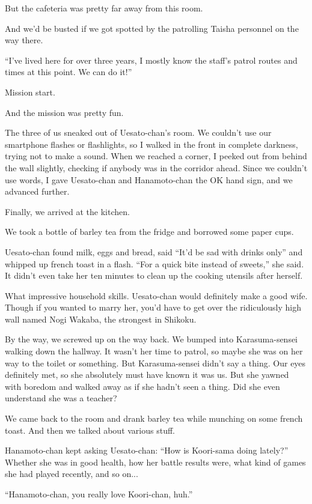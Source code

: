 But the cafeteria was pretty far away from this room.

And we'd be busted if we got spotted by the patrolling Taisha personnel on the way there.

``I've lived here for over three years, I mostly know the staff's patrol routes and times at this point. We can do it!''

Mission start.

And the mission was pretty fun.

The three of us sneaked out of Uesato-chan's room. We couldn't use our smartphone flashes or flashlights, so I walked in the front in complete darkness, trying not to make a sound. When we reached a corner, I peeked out from behind the wall slightly, checking if anybody was in the corridor ahead. Since we couldn't use words, I gave Uesato-chan and Hanamoto-chan the OK hand sign, and we advanced further.

Finally, we arrived at the kitchen.

We took a bottle of barley tea from the fridge and borrowed some paper cups.

Uesato-chan found milk, eggs and bread, said ``It'd be sad with drinks only'' and whipped up french toast in a flash. ``For a quick bite instead of sweets,'' she said. It didn't even take her ten minutes to clean up the cooking utensils after herself.

What impressive household skills. Uesato-chan would definitely make a good wife. Though if you wanted to marry her, you'd have to get over the ridiculously high wall named Nogi Wakaba, the strongest in Shikoku.

By the way, we screwed up on the way back. We bumped into Karasuma-sensei walking down the hallway. It wasn't her time to patrol, so maybe she was on her way to the toilet or something. But Karasuma-sensei didn't say a thing. Our eyes definitely met, so she absolutely must have known it was us. But she yawned with boredom and walked away as if she hadn't seen a thing. Did she even understand she was a teacher?

We came back to the room and drank barley tea while munching on some french toast. And then we talked about various stuff.

Hanamoto-chan kept asking Uesato-chan: ``How is Koori-sama doing lately?'' Whether she was in good health, how her battle results were, what kind of games she had played recently, and so on...

``Hanamoto-chan, you really love Koori-chan, huh.''

